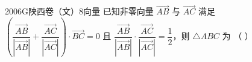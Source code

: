 
\begin{problem}{2006}{G}{陕西卷（文）}{8}{向量}
已知非零向量 $ \overrightarrow{AB} $ 与 $ \overrightarrow{AC} $ 满足 $ \left( \dfrac{\overrightarrow{AB}}{|\overrightarrow{AB}|} + \dfrac{\overrightarrow{AC}}{|\overrightarrow{AC}|} \right) \cdot \overrightarrow{BC} = 0 $ 且 $ \dfrac{\overrightarrow{AB}}{|\overrightarrow{AB}|} \cdot \dfrac{\overrightarrow{AC}}{|\overrightarrow{AC}|} = \dfrac{1}{2} $，则 $ \triangle ABC $ 为 （ ）
\begin{choices}
\end{choices}
\end{problem}

\begin{answer}

\end{answer}

\begin{solutions}

\end{solutions}
